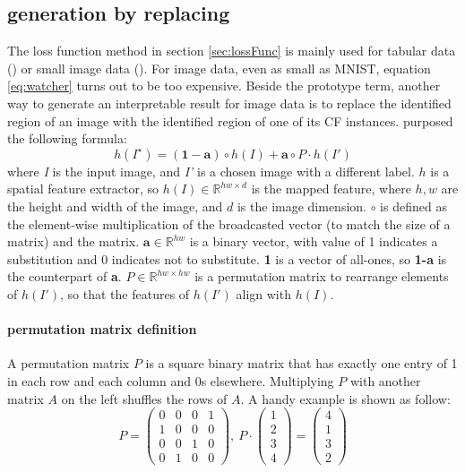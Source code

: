\subsection{generation by replacing}
The loss function method in section \ref{sec:lossFunc} is mainly used for tabular data (\cite{DiCE,watcher2017,prototype}) or small image data (\cite{prototype}). For image data, even as small as MNIST, equation \ref{eq:watcher} turns out to be too expensive. Beside the prototype term, another way to generate an interpretable result for image data is to replace the identified region of an image with the identified region of one of its CF instances. \cite{visualCounterfactual} purposed the following formula:
\begin{equation}\label{eq:visualCF}
  h(I^\star)=(\mathbf{1}-\mathbf{a})\circ h(I)+\mathbf{a}\circ P\cdot h(I')
\end{equation}
where \emph{I} is the input image, and \emph{I'} is a chosen image with a different label. $h$ is a spatial feature extractor, so $h(I)\in\mathbb{R}^{hw\times d}$ is the mapped feature, where $h,w$ are the height and width of the image, and $d$ is the image dimension. $\circ$ is defined as the element-wise multiplication of the broadcasted vector (to match the size of a matrix) and the matrix. $\mathbf{a}\in\mathbb{R}^{hw}$ is a binary vector, with value of 1 indicates a substitution and 0 indicates not to substitute. \textbf{1} is a vector of all-ones, so \textbf{1-a} is the counterpart of \textbf{a}. $P\in\mathbb{R}^{hw\times hw}$ is a permutation matrix to rearrange elements of $h(I')$, so that the features of $h(I')$ align with $h(I)$.
\paragraph{permutation matrix definition} A permutation matrix $P$ is a square binary matrix that has exactly one entry of 1 in each row and each column and 0s elsewhere. Multiplying $P$ with another matrix $A$ on the left shuffles the rows of $A$. A handy example is shown as follow:
$$
P=\begin{pmatrix}
    0 & 0 & 0 & 1 \\
    1 & 0 & 0 & 0 \\
    0 & 0 & 1 & 0 \\
    0 & 1 & 0 & 0
  \end{pmatrix},\
P\cdot\begin{pmatrix}
        1 \\
        2 \\
        3 \\
        4
      \end{pmatrix}=\begin{pmatrix}
                      4 \\
                      1 \\
                      3 \\
                      2
                    \end{pmatrix}
$$

